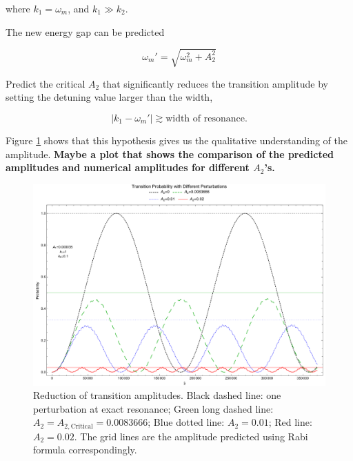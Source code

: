 \documentclass[%
preprint,
 amsmath,amssymb,
 aps,
]{revtex4-1}
\begin{document}
where $k_1 = \omega_m$, and $k_1 \gg k_2$.

The new energy gap can be predicted

\begin{equation}
\omega_m' = \sqrt{\omega_m^2 + A_2^2}
\end{equation}

Predict the critical $A_2$ that significantly reduces the transition amplitude by setting the detuning value larger than the width,

\begin{equation}
\lvert k_1 - \omega_m' \rvert \gtrsim \text{width of resonance}.
\end{equation}




Figure \ref{fig-rabi-oscillations-energy-gap-change} shows that this hypothesis gives us the qualitative understanding of the amplitude. {\bf Maybe a plot that shows the comparison of the predicted amplitudes and numerical amplitudes for different $A_2$'s.}


\begin{figure}[!htbp]
                \centering
                \includegraphics[width=\textwidth]{assets/rabi-oscillations-energy-gap-change}
                \caption{Reduction of transition amplitudes. Black dashed line: one perturbation at exact resonance; Green long dashed line: $A_2=A_{2,\mathrm{Critical}}=0.0083666$; Blue dotted line: $A_2=0.01$; Red line: $A_2=0.02$. The grid lines are the amplitude predicted using Rabi formula correspondingly.}
                \label{fig-rabi-oscillations-energy-gap-change}
\end{figure}
\end{document}
